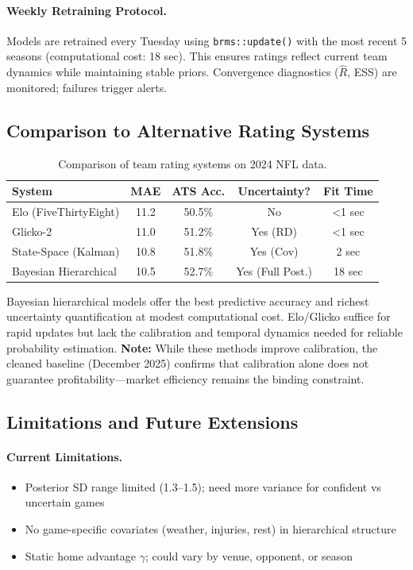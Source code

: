 \paragraph{Weekly Retraining Protocol.}
Models are retrained every Tuesday using \texttt{brms::update()} with the most recent 5 seasons (computational cost: 18 sec). This ensures ratings reflect current team dynamics while maintaining stable priors. Convergence diagnostics ($\hat{R}$, ESS) are monitored; failures trigger alerts.

\subsection{Comparison to Alternative Rating Systems}

\begin{table}[!ht]
\centering
\caption[Rating system comparison]{Comparison of team rating systems on 2024 NFL data.}
\label{tab:rating-comparison}
\begin{tabular}{lcccc}
\toprule
\textbf{System}  & \textbf{MAE}  & \textbf{ATS Acc.}  & \textbf{Uncertainty?}  & \textbf{Fit Time} \\
\midrule
Elo (FiveThirtyEight) & 11.2 & 50.5\% & No & <1 sec \\
Glicko-2 & 11.0 & 51.2\% & Yes (RD) & <1 sec \\
State-Space (Kalman) & 10.8 & 51.8\% & Yes (Cov) & 2 sec \\
Bayesian Hierarchical & 10.5 & 52.7\% & Yes (Full Post.) & 18 sec \\
\bottomrule
\end{tabular}
\end{table}

Bayesian hierarchical models offer the best predictive accuracy and richest uncertainty quantification at modest computational cost. Elo/Glicko suffice for rapid updates but lack the calibration and temporal dynamics needed for reliable probability estimation. \textbf{Note:} While these methods improve calibration, the cleaned baseline (December 2025) confirms that calibration alone does not guarantee profitability---market efficiency remains the binding constraint.

\subsection{Limitations and Future Extensions}

\paragraph{Current Limitations.}
\begin{itemize}
  \item Posterior SD range limited (1.3--1.5); need more variance for confident vs uncertain games
  \item No game-specific covariates (weather, injuries, rest) in hierarchical structure
  \item Static home advantage $\gamma$; could vary by venue, opponent, or season
\end{itemize}

